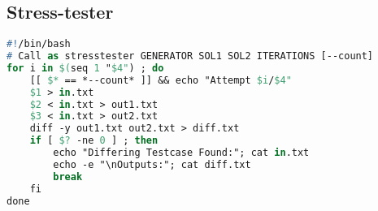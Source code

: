 \subsection*{Stress-tester}
\begin{lstlisting}[language= Pascal, commentstyle=\color{black}, numberstyle=\tiny\color{black}, keywordstyle=\color{black}, stringstyle=\color{black},
]
#!/bin/bash
# Call as stresstester GENERATOR SOL1 SOL2 ITERATIONS [--count]
for i in $(seq 1 "$4") ; do
    [[ $* == *--count* ]] && echo "Attempt $i/$4"
    $1 > in.txt
    $2 < in.txt > out1.txt
    $3 < in.txt > out2.txt
    diff -y out1.txt out2.txt > diff.txt
    if [ $? -ne 0 ] ; then
        echo "Differing Testcase Found:"; cat in.txt
        echo -e "\nOutputs:"; cat diff.txt
        break
    fi
done
\end{lstlisting}
